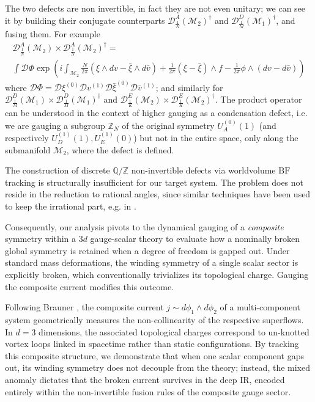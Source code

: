 \documentclass[aps,preprint,nofootinbib,preprintnumbers,eqsecnum,superscriptaddress]{revtex4}
\numberwithin{equation}{section}
\begin{document}
The two defects are non invertible, in fact they are not even unitary; we can see it by building their conjugate counterparts $\mathcal{D}^A_{\frac{1}{N}} (\mathcal{M}_2)^\dagger$ and $\mathcal{D}^D_{\frac{1}{M}} (\mathcal{M}_1)^\dagger$, and fusing them. For example 
\begin{multline}
    \mathcal{D}^A_{\frac{1}{N}} (\mathcal{M}_2) \times \mathcal{D}^A_{\frac{1}{N}} (\mathcal{M}_2)^\dagger  = \\ 
     \int \mathcal{D}\Phi \exp \left(  i  \int_{\mathcal{M}_2}  \frac{N}{2 \pi} ( \xi \wedge dv - \bar \xi \wedge d \bar v)+ \frac{1}{2 \pi} (\xi - \bar \xi) \wedge f - \frac{1}{2 \pi} \phi \wedge (dv - d \bar v) \right)
\end{multline}
where $\mathcal{D}\Phi = \mathcal{D}\xi^{(0)} \mathcal{D}v^{(1)}  \mathcal{D}\bar\xi^{(0)} \mathcal{D}\bar v^{(1)}$; and similarly for $\mathcal{D}^D_{\frac{1}{M}} (\mathcal{M}_1) \times \mathcal{D}^D_{\frac{1}{M}} (\mathcal{M}_1)^\dagger$ and $\mathcal{D}^E_{\frac{1}{K}} (\mathcal{M}_2) \times \mathcal{D}^E_{\frac{1}{K}} (\mathcal{M}_2)^\dagger$. The product operator can be understood in the context of higher gauging as a condensation defect, i.e. we are gauging a subgroup $\mathbb{Z}_N$ of the original symmetry $U_A^{(0)}(1)$ (and respectively $U_D^{(1)}(1), U_E^{(1)}(0)$) but not in the entire space, only along the submanifold $\mathcal{M}_2$, where the defect is defined.

\begin{tcolorbox}[title={Conclusion}]
    The construction of discrete $\mathbb{Q}/\mathbb{Z}$ non-invertible defects via worldvolume $\text{BF}$ tracking is structurally insufficient for our target system. The problem does not reside in the reduction to rational angles, since similar techniques have been used to keep the irrational part, e.g. in \cite{Arbalestrier_2025}. 

Consequently, our analysis pivots to the dynamical gauging of a \textit{composite} symmetry within a $3d$ gauge-scalar theory to evaluate how a nominally broken global symmetry is retained when a degree of freedom is gapped out. Under standard mass deformations, the winding symmetry of a single scalar sector is explicitly broken, which conventionally trivializes its topological charge. Gauging the composite current modifies this outcome. 

Following Brauner \cite{Brauner_2021}, the composite current $j \sim  d\phi_1 \wedge d\phi_2$ of a multi-component system geometrically measures the non-collinearity of the respective superflows. In $d=3$ dimensions, the associated topological charges correspond to un-knotted vortex loops linked in spacetime rather than static configurations. By tracking this composite structure, we demonstrate that when one scalar component gaps out, its winding symmetry does not decouple from the theory; instead, the mixed anomaly dictates that the broken current survives in the deep IR, encoded entirely within the non-invertible fusion rules of the composite gauge sector.
\end{tcolorbox}
\end{document}
